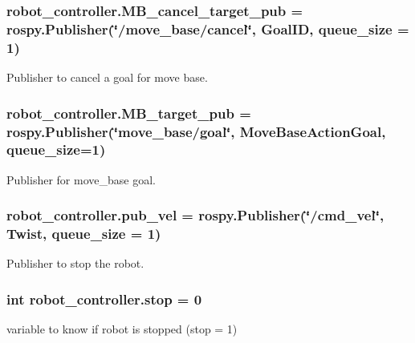 \subsubsection[{\texorpdfstring{M\+B\+\_\+cancel\+\_\+target\+\_\+pub}{MB_cancel_target_pub}}]{\setlength{\rightskip}{0pt plus 5cm}robot\+\_\+controller.\+M\+B\+\_\+cancel\+\_\+target\+\_\+pub = rospy.\+Publisher(\char`\"{}/move\+\_\+base/cancel\char`\"{}, Goal\+ID, queue\+\_\+size = 1)}\hypertarget{namespacerobot__controller_a28b92e88799eaa024e647defbb277ccb}{}\label{namespacerobot__controller_a28b92e88799eaa024e647defbb277ccb}


Publisher to cancel a goal for move base. 

\subsubsection[{\texorpdfstring{M\+B\+\_\+target\+\_\+pub}{MB_target_pub}}]{\setlength{\rightskip}{0pt plus 5cm}robot\+\_\+controller.\+M\+B\+\_\+target\+\_\+pub = rospy.\+Publisher(\char`\"{}move\+\_\+base/goal\char`\"{}, Move\+Base\+Action\+Goal, queue\+\_\+size=1)}\hypertarget{namespacerobot__controller_a0a6317b5d0ddfe8cd682bdf9ad35f6f3}{}\label{namespacerobot__controller_a0a6317b5d0ddfe8cd682bdf9ad35f6f3}


Publisher for move\+\_\+base goal. 

\subsubsection[{\texorpdfstring{pub\+\_\+vel}{pub_vel}}]{\setlength{\rightskip}{0pt plus 5cm}robot\+\_\+controller.\+pub\+\_\+vel = rospy.\+Publisher(\char`\"{}/cmd\+\_\+vel\char`\"{}, Twist, queue\+\_\+size = 1)}\hypertarget{namespacerobot__controller_ac9cb673d888175b8d312b09650d380c9}{}\label{namespacerobot__controller_ac9cb673d888175b8d312b09650d380c9}


Publisher to stop the robot. 

\subsubsection[{\texorpdfstring{stop}{stop}}]{\setlength{\rightskip}{0pt plus 5cm}int robot\+\_\+controller.\+stop = 0}\hypertarget{namespacerobot__controller_a0639b371a07a4ecfd43a5848b1eafddf}{}\label{namespacerobot__controller_a0639b371a07a4ecfd43a5848b1eafddf}


variable to know if robot is stopped (stop = 1) 

